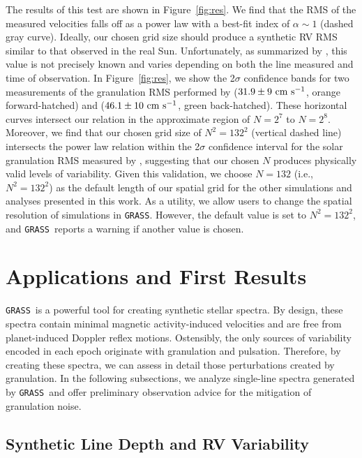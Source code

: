 \documentclass[twocolumn]{aastex63}
\newcommand{\cms}{\ {\rm cm\ s}^{-1}}
\newcommand{\grass}{\texttt{GRASS}}
\newcommand{\revise}[1]{#1}
\begin{document}
The results of this test are shown in Figure~\ref{fig:res}. We find that the RMS of the measured velocities falls off as a power law with a best-fit index of \revise{$\alpha \sim 1$ (dashed gray curve)}. Ideally, our \revise{chosen grid size should produce a synthetic RV RMS} similar to that observed in the real Sun. Unfortunately, as summarized by \citet{Cegla2019a}, this value is not precisely known and varies depending on both the line measured and time of observation. In Figure~\ref{fig:res}, we show the 2$\sigma$ confidence bands for \revise{two measurements of} the granulation RMS \revise{performed} by \citealt{Elsworth1994} ($31.9 \pm 9 \cms$, \revise{orange forward-hatched}) and \citealt{Palle1999} ($46.1 \pm 10 \cms$, green \revise{back-hatched}). These horizontal curves intersect our relation in the approximate region of $N = 2^7$ to $N=2^8$. \revise{Moreover, we find that our chosen grid size of $N^2 = 132^2$ (vertical dashed line) intersects the power law relation within the 2$\sigma$ confidence interval for the solar granulation RMS measured by \citet{Palle1999}, suggesting that our chosen $N$ produces physically valid levels of variability.} Given this \revise{validation}, we choose $N = 132$ (i.e., $N^2 = 132^2$) as the default \revise{length of our} spatial grid for the other simulations and analyses presented in this work. \revise{As a utility, we allow users to change the spatial resolution of simulations in \grass. However, the default value is set to $N^2 = 132^2$, and \grass\ reports a warning if another value is chosen.} \par

\section{Applications and First Results} \label{results}

\grass\ is a powerful tool for creating synthetic stellar spectra. By design, these spectra contain minimal magnetic activity-induced velocities and are free from planet-induced Doppler reflex motions. Ostensibly, the only sources of variability encoded in each epoch originate with granulation and pulsation. Therefore, by creating these spectra, we can assess in detail those perturbations created by granulation. In the following subsections, we analyze single-line spectra generated by \grass\ and offer preliminary observation advice for the mitigation of granulation noise. \par 

\subsection{Synthetic Line Depth and RV Variability} \label{sec:depth_var}
\end{document}
